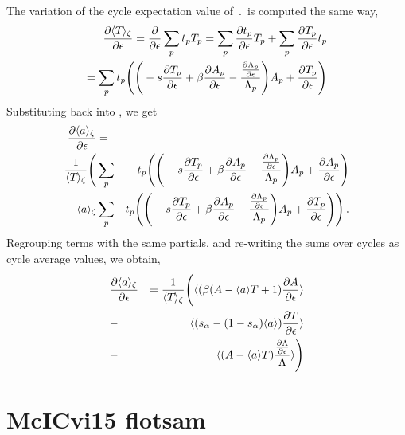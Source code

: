 \documentclass[aps,pre,
                showpacs,
                twocolumn,
                groupedaddress,
                superscriptaddress,
                floatfix]{revtex4-1}
\begin{document}
The variation of the cycle expectation value of $\period{}$ is computed the same way,
\begin{eqnarray*}
\frac{\partial \langle {{\ensuremath{T_{}}}} \rangle_{\zeta}}
     {\partial \epsilon}
= \frac{\partial}{\partial \epsilon}\sum_{p}t_{p}{T_{p}}
=   \sum_{p}\frac{\partial t_{p}}{\partial \epsilon}{T_{p}}
  + \sum_{p}\frac{\partial {\ensuremath{T_{p}}}}{\partial \epsilon} t_{p}
\\
= \sum_{p}t_{p}
      \Bigg(
          \Bigg(
-s\frac{\partial {\ensuremath{T_{p}}}}{\partial \epsilon}
+ \beta \frac{\partial A_{p}}{\partial \epsilon}
- \frac{\frac{\partial \Lambda_{p}}{\partial \epsilon}}{\Lambda_{p}}
          \Bigg) A_{p}
+\frac{\partial {\ensuremath{T_{p}}}}{\partial \epsilon}
      \Bigg)
\end{eqnarray*}
Substituting back into , we get
\begin{eqnarray*}
\frac{\partial \langle {a} \rangle_{\zeta}}{\partial \epsilon}
&=&\\
\frac{1}{\langle {{\ensuremath{T_{}}}} \rangle_{\zeta}}
    \Bigg(&\sum_{p}&
    t_{p}\Bigg(
            \Bigg(
-s\frac{\partial {\ensuremath{T_{p}}}}{\partial \epsilon}
+ \beta \frac{\partial A_{p}}{\partial \epsilon}
- \frac{\frac{\partial \Lambda_{p}}{\partial \epsilon}}{\Lambda_{p}}
            \Bigg) A_{p} +\frac{\partial A_{p}}{\partial \epsilon}
        \Bigg)\\
- \langle {a} \rangle_{\zeta} &\sum_{p}&t_{p}
        \Bigg(
            \Bigg(
-s\frac{\partial {\ensuremath{T_{p}}}}{\partial \epsilon}
+ \beta \frac{\partial A_{p}}{\partial \epsilon}
- \frac{\frac{\partial \Lambda_{p}}{\partial \epsilon}}{\Lambda_{p}}
            \Bigg) A_{p} +\frac{\partial {\ensuremath{T_{p}}}}{\partial \epsilon}
        \Bigg)
    \Bigg)
\,.
\end{eqnarray*}
Regrouping terms with the same partials, and re-writing the
sums  over cycles as cycle average values, we obtain,
\begin{eqnarray*}
&\frac{\partial \langle {\ensuremath{a}} \rangle_{\zeta}}{\partial \epsilon}
& = \frac{1}{\langle {{\ensuremath{T_{}}}} \rangle_{\zeta}}
    \Bigg(
\langle {(\beta(\ensuremath{A}-\langle {\ensuremath{a}} \rangle T + 1)\frac{\partial\ensuremath{A}}{\partial\epsilon}} \rangle \\
&-& \langle {(s_{\alpha}-(1-s_{\alpha})\langle {a} \rangle)\frac{\partial T}{\partial\epsilon}} \rangle  \\
&-& \langle {(\ensuremath{A}-\langle {\ensuremath{a}} \rangle T) \frac{\frac{\partial\Lambda}{\partial\epsilon}}{\Lambda}} \rangle
    \Bigg)
\end{eqnarray*}




\ifboyscout
\newpage
    \section{McICvi15 flotsam}
    \label{s:flotsam}
    
\newpage
\fi
\end{document}
